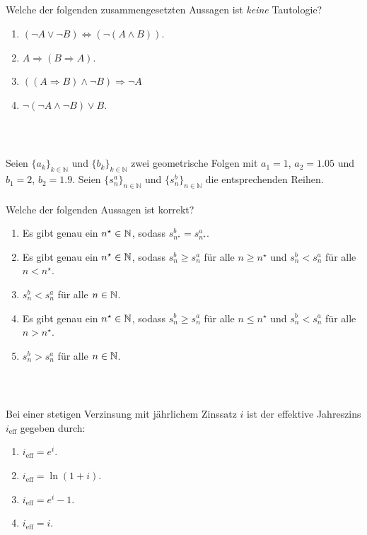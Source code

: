 \subsection*{}
Welche der folgenden zusammengesetzten Aussagen ist \textit{keine} Tautologie? 
\renewcommand{\labelenumi}{(\alph{enumi})}
\begin{enumerate}
	\item $( \neg A \vee \neg B ) \Leftrightarrow (\neg  (A \wedge B))$.
	\item $ A \Rightarrow ( B \Rightarrow A)$.
	\item $ ((A \Rightarrow B) \wedge \neg  B) \Rightarrow \neg A$
	\item $ \neg ( \neg A \wedge \neg  B ) \vee B$.
\end{enumerate}
\ \\
\subsection*{}
Seien $\{a_k\}_{k \in \mathbb{N}}$ und $\{b_k\}_{k \in \mathbb{N}}$ zwei geometrische Folgen mit $a_1 = 1$, $a_2= 1.05$ und $b_1 = 2$, $b_2 = 1.9$. Seien $\{s_n^a \}_{n \in \mathbb{N}}$ und $\{s_n^b \}_{n \in \mathbb{N}}$ die entsprechenden Reihen.\\
\\
Welche der folgenden Aussagen ist korrekt?
\renewcommand{\labelenumi}{(\alph{enumi})}
\begin{enumerate}
\item 
Es gibt genau ein $n^\star \in \mathbb{N}$, sodass $s^b_{n^\star} = s^a_{n^\star} $.
\item 
Es gibt genau ein $n^\star \in \mathbb{N}$, sodass $s^b_n \geq s_n^a$ für alle $n \geq n^\star$ und $s_n^b < s_n^a$ für alle $n < n^\star$.
\item 
 $s_n^b < s_n^a$ für alle $n \in \mathbb{N}$.
\item
Es gibt genau ein $n^\star \in \mathbb{N}$, sodass $s_n^b \geq s_n^a$ für alle $n \leq n^\star$ und $s_n^b < s_n^a$ für alle $n > n^\star$.
\item 
$s_n^b > s_n^a$ für alle $n \in \mathbb{N}$.
\end{enumerate}
\ \\
\subsection*{}
Bei einer stetigen Verzinsung mit jährlichem Zinssatz $i$ ist der effektive Jahreszins $i_{\mathrm{eff}}$ gegeben durch:
\renewcommand{\labelenumi}{(\alph{enumi})}
\begin{enumerate}
	\item 
	$i_{\mathrm{eff}} = e^i$.
	\item
	$i_{\mathrm{eff}} = \ln(1+ i)$.
	\item
	$i_{\mathrm{eff}} = e^i -1$.
	\item
	$i_{\mathrm{eff}} = i$.
\end{enumerate}
\ \\

